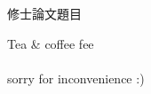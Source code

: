 \documentclass[14pt]{article}
\begin{document}
\begin{titlepage}
{\Huge
	\vspace{2cm}
	修士論文題目
	\begin{center}
	Tea \& coffee fee\\
\vspace{2cm}
\\
\vspace{2cm}
{\huge sorry for inconvenience :)}
	\end{center}
}
\end{titlepage}
\end{document}
